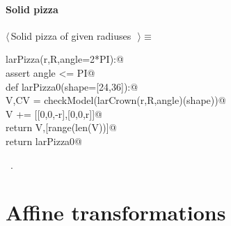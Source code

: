 \documentclass[11pt,oneside]{article}	%
\begin{document}
\paragraph{Solid pizza}
\begin{flushleft} \small \label{scrap22}
$\langle\,$Solid pizza of given radiuses\nobreak\ {\footnotesize {}}$\,\rangle\equiv$
\vspace{-1ex}
\begin{list}{}{} \item
\mbox{}\verb@def larPizza(r,R,angle=2*PI):@\\
\mbox{}\verb@   assert angle <= PI@\\
\mbox{}\verb@   def larPizza0(shape=[24,36]):@\\
\mbox{}\verb@      V,CV = checkModel(larCrown(r,R,angle)(shape))@\\
\mbox{}\verb@      V += [[0,0,-r],[0,0,r]]@\\
\mbox{}\verb@      return V,[range(len(V))]@\\
\mbox{}\verb@   return larPizza0@\\
\mbox{}\verb@@{\NWsep}
\end{list}
\vspace{-1ex}
\footnotesize\addtolength{\baselineskip}{-1ex}
\begin{list}{}{\setlength{\itemsep}{-\parsep}\setlength{\itemindent}{-\leftmargin}}
\item \NWtxtMacroRefIn\ .
\end{list}
\end{flushleft}
\section{Affine transformations}
\end{document}
